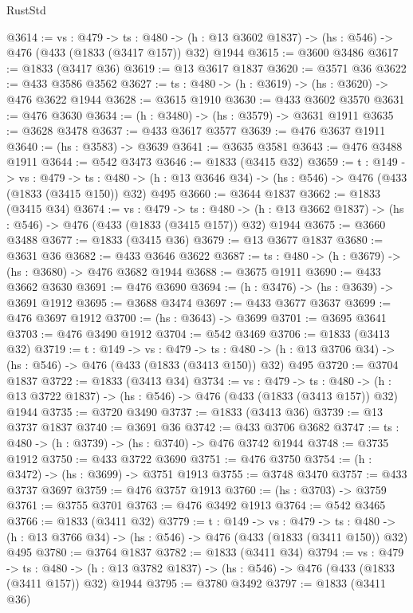 \begin{lexlean}{RustStd}
\begin{coremodule}
@3614 := {vs : @479} ->
  {ts : @480} -> (h : @13 @3602 @1837) -> (hs : @546) -> @476 (@433 (@1833 (@3417 @157)) @32) @1944
@3615 := @3600 @3486
@3617 := @1833 (@3417 @36)
@3619 := @13 @3617 @1837
@3620 := @3571 @36
@3622 := @433 @3586 @3562
@3627 := {ts : @480} -> (h : @3619) -> (hs : @3620) -> @476 @3622 @1944
@3628 := @3615 @1910
@3630 := @433 @3602 @3570
@3631 := @476 @3630
@3634 := (h : @3480) -> (hs : @3579) -> @3631 @1911
@3635 := @3628 @3478
@3637 := @433 @3617 @3577
@3639 := @476 @3637 @1911
@3640 := (hs : @3583) -> @3639
@3641 := @3635 @3581
@3643 := @476 @3488 @1911
@3644 := @542 @3473
@3646 := @1833 (@3415 @32)
@3659 := {t : @149} ->
  {vs : @479} ->
  {ts : @480} -> (h : @13 @3646 @34) -> (hs : @546) -> @476 (@433 (@1833 (@3415 @150)) @32) @495
@3660 := @3644 @1837
@3662 := @1833 (@3415 @34)
@3674 := {vs : @479} ->
  {ts : @480} -> (h : @13 @3662 @1837) -> (hs : @546) -> @476 (@433 (@1833 (@3415 @157)) @32) @1944
@3675 := @3660 @3488
@3677 := @1833 (@3415 @36)
@3679 := @13 @3677 @1837
@3680 := @3631 @36
@3682 := @433 @3646 @3622
@3687 := {ts : @480} -> (h : @3679) -> (hs : @3680) -> @476 @3682 @1944
@3688 := @3675 @1911
@3690 := @433 @3662 @3630
@3691 := @476 @3690
@3694 := (h : @3476) -> (hs : @3639) -> @3691 @1912
@3695 := @3688 @3474
@3697 := @433 @3677 @3637
@3699 := @476 @3697 @1912
@3700 := (hs : @3643) -> @3699
@3701 := @3695 @3641
@3703 := @476 @3490 @1912
@3704 := @542 @3469
@3706 := @1833 (@3413 @32)
@3719 := {t : @149} ->
  {vs : @479} ->
  {ts : @480} -> (h : @13 @3706 @34) -> (hs : @546) -> @476 (@433 (@1833 (@3413 @150)) @32) @495
@3720 := @3704 @1837
@3722 := @1833 (@3413 @34)
@3734 := {vs : @479} ->
  {ts : @480} -> (h : @13 @3722 @1837) -> (hs : @546) -> @476 (@433 (@1833 (@3413 @157)) @32) @1944
@3735 := @3720 @3490
@3737 := @1833 (@3413 @36)
@3739 := @13 @3737 @1837
@3740 := @3691 @36
@3742 := @433 @3706 @3682
@3747 := {ts : @480} -> (h : @3739) -> (hs : @3740) -> @476 @3742 @1944
@3748 := @3735 @1912
@3750 := @433 @3722 @3690
@3751 := @476 @3750
@3754 := (h : @3472) -> (hs : @3699) -> @3751 @1913
@3755 := @3748 @3470
@3757 := @433 @3737 @3697
@3759 := @476 @3757 @1913
@3760 := (hs : @3703) -> @3759
@3761 := @3755 @3701
@3763 := @476 @3492 @1913
@3764 := @542 @3465
@3766 := @1833 (@3411 @32)
@3779 := {t : @149} ->
  {vs : @479} ->
  {ts : @480} -> (h : @13 @3766 @34) -> (hs : @546) -> @476 (@433 (@1833 (@3411 @150)) @32) @495
@3780 := @3764 @1837
@3782 := @1833 (@3411 @34)
@3794 := {vs : @479} ->
  {ts : @480} -> (h : @13 @3782 @1837) -> (hs : @546) -> @476 (@433 (@1833 (@3411 @157)) @32) @1944
@3795 := @3780 @3492
@3797 := @1833 (@3411 @36)

\end{coremodule}
\end{lexlean}
